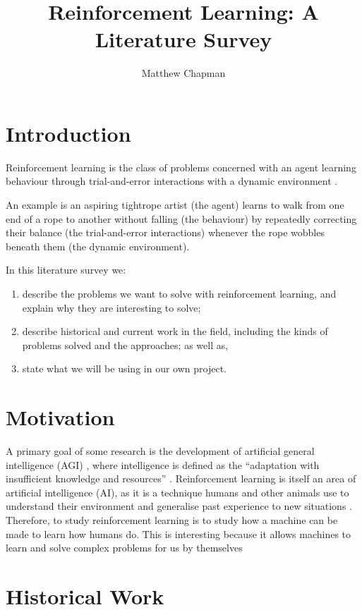 \documentclass{article}
\title{Reinforcement Learning: A Literature Survey}
\author{Matthew Chapman}
\begin{document}
\maketitle

\section{Introduction}

Reinforcement learning is the class of problems concerned with an agent learning behaviour through trial-and-error interactions with a dynamic environment \cite{Kaelbling1996}.

An example is an aspiring tightrope artist (the agent) learns to walk
from one end of a rope to another without falling (the behaviour) by
repeatedly correcting their balance (the trial-and-error interactions) whenever the rope wobbles beneath them (the dynamic environment).

In this literature survey we: 
\begin{enumerate}
  \item{describe the problems we want to solve with reinforcement learning, and explain why they are interesting to solve;} 
  \item{describe historical and current work in the field, including the kinds of problems solved and the approaches; as well as,} 
  \item{state what we will be using in our own project.}
\end{enumerate}

\section{Motivation}

A primary goal of some research is the development of artificial general intelligence (AGI) \cite{}, where intelligence is defined as the ``adaptation with insufficient knowledge and resources'' \cite{OnDefiningArtificialIntelligence}. Reinforcement learning is itself an area of artificial intelligence (AI), as it is a technique humans and other animals use to understand their environment and generalise past experience to new situations \cite{Mnih2015}. Therefore, to study reinforcement learning is to study how a machine can be made to learn how humans do. This is interesting because it allows machines to learn and solve complex problems for us by themselves

\section{Historical Work}
\end{document}
